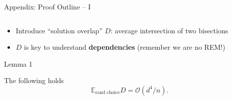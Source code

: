 \documentclass[presentation,12pt]{beamer}
\begin{document}
\begin{frame}{Appendix: Proof Outline -- I}
  
  \begin{columns}
  \begin{column}{0.8\textwidth}
    \begin{itemize}
      \item Introduce ``solution overlap'' $D$: average intersection of
      two bisections
      \item $D$ is key to understand \textbf{dependencies} (remember 
      we are no REM!)
    \end{itemize}
  \vspace{1em}

  \begin{block}{\rule[-0.6ex]{0pt}{2.5ex}Lemma 1}
  The following holds
  \[
      \mathbb{E}_{\text{rand choice}} D = \mathcal{O}(d^4 / n).
    \]
  \end{block}


\end{column}
\end{columns}
\end{frame}
\end{document}
